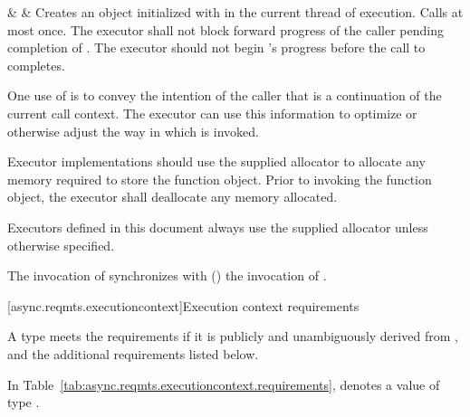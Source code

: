 \begin{libreqtab3}
  &
  &
\effects Creates an object  initialized with  in the current thread of execution. Calls  at most once. The executor shall not block forward progress of the caller pending completion of . The executor should not begin 's progress before the call to  completes. \begin{note} One use of  is to convey the intention of the caller that  is a continuation of the current call context. The executor can use this information to optimize or otherwise adjust the way in which  is invoked. \end{note}  Executor implementations should use the supplied allocator to allocate any memory required to store the function object. Prior to invoking the function object, the executor shall deallocate any memory allocated. \begin{note} Executors defined in this document always use the supplied allocator unless otherwise specified. \end{note}\br
\sync The invocation of  synchronizes with () the invocation of .  \\

\end{libreqtab3}



[async.reqmts.executioncontext]{Execution context requirements}

%
\pnum
A type  meets the  requirements if it is publicly and unambiguously derived from , and  the additional requirements listed below.

\pnum
In Table~\ref{tab:async.reqmts.executioncontext.requirements},  denotes a value of type .

